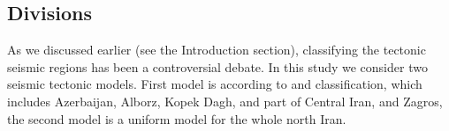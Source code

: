 \subsection{Divisions}

As we discussed earlier (see the Introduction section), classifying the tectonic seismic regions has been a controversial debate. In this study we consider two seismic tectonic models. First model is according to \citet{Mirzaei1998} and \citet{Karimiparidari2013} classification, which includes Azerbaijan, Alborz, Kopek Dagh, and part of Central Iran, and Zagros, the second model is a uniform model for the whole north Iran.  
